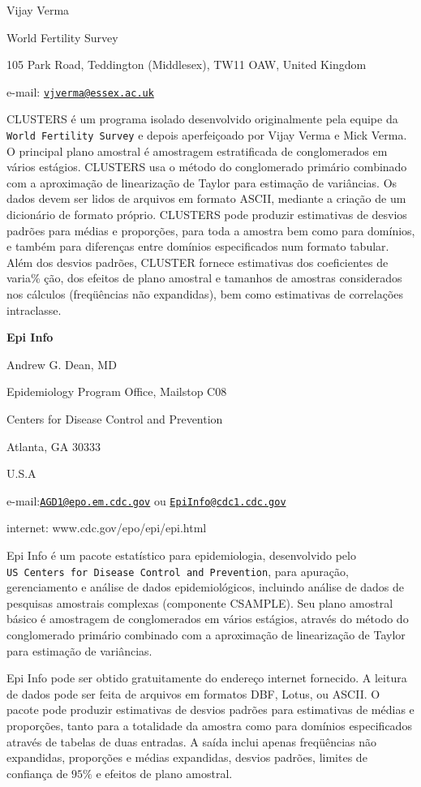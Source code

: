 \documentclass[]{book}
\theoremstyle{definition}
\theoremstyle{definition}
\theoremstyle{definition}
\theoremstyle{remark}
\begin{document}
Vijay Verma

World Fertility Survey

105 Park Road, Teddington (Middlesex), TW11 OAW, United Kingdom

e-mail:
\href{mailto:vjverma@essex.ac.uk}{\nolinkurl{vjverma@essex.ac.uk}}

CLUSTERS é um programa isolado desenvolvido originalmente pela equipe da
\texttt{World\ Fertility\ Survey} e depois aperfeiçoado por Vijay Verma
e Mick Verma. O principal plano amostral é amostragem estratificada de
conglomerados em vários estágios. CLUSTERS usa o método do conglomerado
primário combinado com a aproximação de linearização de Taylor para
estimação de variâncias. Os dados devem ser lidos de arquivos em formato
ASCII, mediante a criação de um dicionário de formato próprio. CLUSTERS
pode produzir estimativas de desvios padrões para médias e proporções,
para toda a amostra bem como para domínios, e também para diferenças
entre domínios especificados num formato tabular. Além dos desvios
padrões, CLUSTER fornece estimativas dos coeficientes de varia\% ção,
dos efeitos de plano amostral e tamanhos de amostras considerados nos
cálculos (freqüências não expandidas), bem como estimativas de
correlações intraclasse.

\textbf{Epi Info}

Andrew G. Dean, MD

Epidemiology Program Office, Mailstop C08

Centers for Disease Control and Prevention

Atlanta, GA 30333

U.S.A

e-mail:\href{mailto:AGD1@epo.em.cdc.gov}{\nolinkurl{AGD1@epo.em.cdc.gov}}
ou \href{mailto:EpiInfo@cdc1.cdc.gov}{\nolinkurl{EpiInfo@cdc1.cdc.gov}}

internet: www.cdc.gov/epo/epi/epi.html

Epi Info é um pacote estatístico para epidemiologia, desenvolvido pelo
\texttt{US\ Centers\ for\ Disease\ Control\ and\ Prevention}, para
apuração, gerenciamento e análise de dados epidemiológicos, incluindo
análise de dados de pesquisas amostrais complexas (componente CSAMPLE).
Seu plano amostral básico é amostragem de conglomerados em vários
estágios, através do método do conglomerado primário combinado com a
aproximação de linearização de Taylor para estimação de variâncias.

Epi Info pode ser obtido gratuitamente do endereço internet fornecido. A
leitura de dados pode ser feita de arquivos em formatos DBF, Lotus, ou
ASCII. O pacote pode produzir estimativas de desvios padrões para
estimativas de médias e proporções, tanto para a totalidade da amostra
como para domínios especificados através de tabelas de duas entradas. A
saída inclui apenas freqüências não expandidas, proporções e médias
expandidas, desvios padrões, limites de confiança de \(95\%\) e efeitos
de plano amostral.
\end{document}
